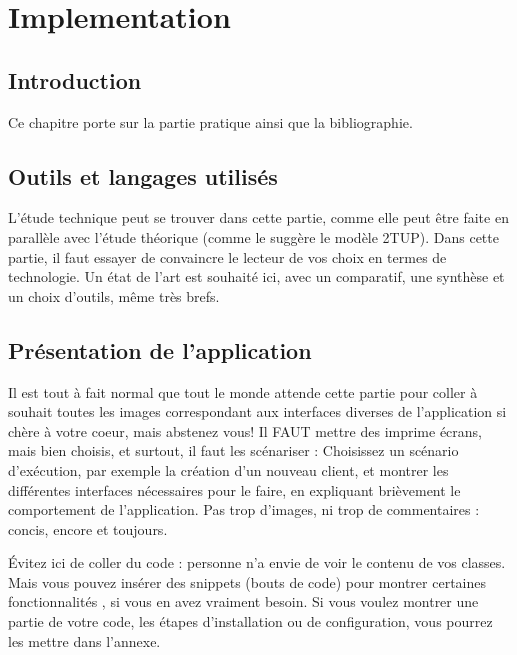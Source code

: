 
\setcounter{chapter}{2}
\chapter{Implementation}
\graphicspath{{Chapitre3/figures/}}

\pagestyle{fancy}
\fancyhf{}
\fancyhead[R]{\bfseries\rightmark}
\fancyfoot[R]{\thepage}
\renewcommand{\headrulewidth}{0.5pt}
\renewcommand{\footrulewidth}{0pt}
\renewcommand{\chaptermark}[1]{\markboth{{\chaptername~\thechapter. #1 }}{}}
\renewcommand{\sectionmark}[1]{\markright{\thechapter.\thesection~ #1}}

\begin{spacing}{1.2}

\section*{Introduction}
Ce chapitre porte sur la partie pratique ainsi que la bibliographie.

\section{Outils et langages utilisés}
L'étude technique peut se trouver dans cette partie, comme elle peut être faite en
parallèle avec l'étude théorique (comme le suggère le modèle 2TUP).
Dans cette partie, il faut essayer de convaincre le lecteur de vos choix en termes de
technologie. Un état de l'art est souhaité ici, avec un comparatif, une synthèse et un choix 
d'outils, même très brefs.
\section{Présentation de l'application}
Il est tout à fait normal que tout le monde attende cette partie pour coller à souhait toutes les images
correspondant aux interfaces diverses de l'application si chère à votre coeur, mais
abstenez vous! Il FAUT mettre des imprime écrans, mais bien choisis, et surtout, il faut les scénariser : Choisissez un scénario d'exécution, par exemple la création d'un 
nouveau client, et montrer les différentes interfaces nécessaires pour le faire, en
expliquant brièvement le comportement de l'application. Pas trop d'images, ni trop de
commentaires : concis, encore et toujours.

Évitez ici de coller du code : personne n'a envie de voir le contenu de vos classes.
Mais  vous  pouvez insérer des snippets (bouts de code) pour montrer certaines
fonctionnalités \cite{knuth-acp}\cite{dirac}, si vous en avez vraiment besoin. Si vous voulez montrer une partie de votre code, les étapes d'installation ou de configuration, vous pourrez les mettre dans l'annexe.

\end{spacing}
